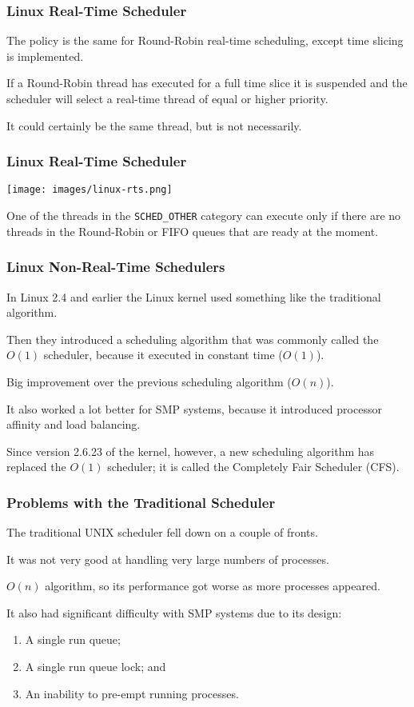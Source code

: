 \begin{frame}
\frametitle{Linux Real-Time Scheduler}

The policy is the same for Round-Robin real-time scheduling, except time slicing is implemented. 

If a Round-Robin thread has executed for a full time slice it is suspended and the scheduler will select a real-time thread of equal or higher priority.

It could certainly be the same thread, but is not necessarily. 

\end{frame}

\begin{frame}
\frametitle{Linux Real-Time Scheduler}

\begin{center}
	\texttt{[image: images/linux-rts.png]}
\end{center}

One of the threads in the \texttt{SCHED\_OTHER} category can execute only if there are no threads in the Round-Robin or FIFO queues that are ready at the moment.


\end{frame}

\begin{frame}
\frametitle{Linux Non-Real-Time Schedulers}

In Linux 2.4 and earlier the Linux kernel used something like the traditional algorithm. 

Then they introduced a scheduling algorithm that was commonly called the $O(1)$ scheduler, because it executed in constant time ($O(1)$). 

Big improvement over the previous scheduling algorithm ($O(n)$).

It also worked a lot better for SMP systems, because it introduced processor affinity and load balancing. 

Since version 2.6.23 of the kernel, however, a new scheduling algorithm has replaced the $O(1)$ scheduler; it is called the \alert{Completely Fair Scheduler} (CFS).


\end{frame}

\begin{frame}
\frametitle{Problems with the Traditional Scheduler}

The traditional UNIX scheduler fell down on a couple of fronts. 

It was not very good at handling very large numbers of processes.

$O(n)$ algorithm, so its performance got worse as more processes appeared. 

It also had significant difficulty with SMP systems due to its design:

\begin{enumerate}
	\item A single run queue;
	\item A single run queue lock; and
	\item An inability to pre-empt running processes.
\end{enumerate}

\end{frame}

